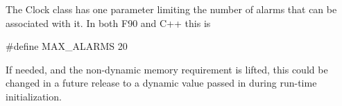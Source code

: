 
The Clock class has one parameter limiting the number of alarms that can be
associated with it.  In  both F90 and C++ this is

        \#define MAX\_ALARMS 20

If needed, and the non-dynamic memory requirement is lifted, this could be
changed in a future release to a dynamic value passed in during run-time
initialization.
